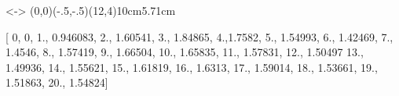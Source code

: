 \documentclass[a4paper]{article}
\begin{document}
	
	\begin{psgraph}[Dy=1,Dx=1,ticksize=4pt,labels=none,linewidth=0.5pt]{<->}%
		(0,0)(-.5,-.5)(12,4){10cm}{5.71cm}
		\dataplot[plotstyle=curve]{\foo}
		\dataplot{[{{0,2.5}{12,2.5}}]}
	\end{psgraph}
	\savedata{\mydata}[ { {0,  0},  {1.,  0.946083},  {2.,  1.60541},  {3.,  1.84865},  {4.,1.7582}, {5.,  1.54993},  {6.,  1.42469},  {7.,  1.4546},  {8.,  1.57419}, {9.,  1.66504},  {10.,  1.65835},  {11.,  1.57831},  {12.,  1.50497} {13.,  1.49936},  {14.,  1.55621},  {15.,  1.61819},  {16.,  1.6313}, {17.,  1.59014},  {18.,  1.53661},  {19.,  1.51863},  {20.,  1.54824}}]
	
	
	\vspace{6cm}
	
	
	\dataplot[plotstyle=curve]{\mydata}
\end{document}
